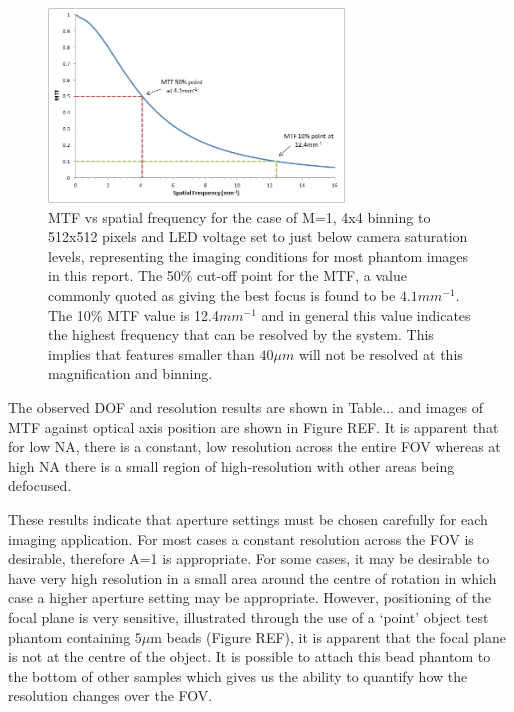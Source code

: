 	\begin{figure}[H]
		\centering
		\includegraphics[width = 0.7\textwidth]{meth_img/MTF_50_graph.png}
		\caption{MTF vs spatial frequency for the case of M=1, 4x4 binning to 512x512 pixels and  LED voltage set to just below camera saturation levels, representing the imaging conditions  for most phantom images in this report. The 50\% cut-off point for the MTF, a value commonly quoted as giving the best focus is found to be $4.1mm^{-1}$. The 10\% MTF value is 12.4$mm^{-1}$ and in general this value indicates the highest  frequency that can be resolved by the system. This implies that features smaller than $40\mu m$ will not be resolved at this magnification and binning.}
		\label{fig:MTF_50}
	\end{figure}








The observed DOF and resolution results are shown in Table... and images of MTF against optical axis position are shown in Figure REF.
It is apparent that for low NA, there is a constant, low resolution across the entire FOV whereas at high NA there is a small region of high-resolution with other areas being defocused. 





These results indicate that aperture settings must be chosen carefully for each imaging application. For most cases a constant resolution across the FOV is desirable, therefore A=1 is appropriate. For some cases, it may be desirable to have very high resolution in a small area around the centre of rotation in which case a higher aperture setting may be appropriate. However, positioning of the focal plane is very sensitive,  illustrated through the use of a `point' object test phantom containing $5\mu $m beads (Figure REF), it is apparent that the focal plane is not at the centre of the object. It is possible to attach this  bead phantom to the bottom of other samples which gives us the ability to quantify  how the resolution changes over the FOV. 




